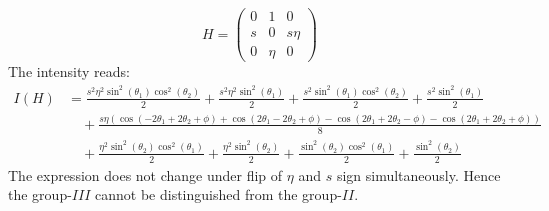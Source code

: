 \documentclass[prd,preprintnumbers,floatfix,
nofootinbib,superscriptaddress]{revtex4}
\newcommand{\II}{\ensuremath{{I\!I}}}
\newcommand{\III}{\ensuremath{{I\!I\!I}}}
\begin{document}
\begin{equation}
  H = \begin{pmatrix}
    0 &1 &0 \\
    s & 0 &s\eta \\
    0 &\eta &0
  \end{pmatrix}
\end{equation}
The intensity reads:
\begin{align}
  I(H) &= \frac{s^{2} \eta^{2} \sin^{2}{\left (\theta_{1} \right )} \cos^{2}{\left (\theta_{2} \right )}}{2} + \frac{s^{2} \eta^{2} \sin^{2}{\left (\theta_{1} \right )}}{2} + \frac{s^{2} \sin^{2}{\left (\theta_{1} \right )} \cos^{2}{\left (\theta_{2} \right )}}{2} + \frac{s^{2} \sin^{2}{\left (\theta_{1} \right )}}{2} \\ \nonumber
   &\quad + \frac{s \eta \left(\cos{\left (- 2 \theta_{1} + 2 \theta_{2} + \phi \right )} + \cos{\left (2 \theta_{1} - 2 \theta_{2} + \phi \right )} - \cos{\left (2 \theta_{1} + 2 \theta_{2} - \phi \right )} - \cos{\left (2 \theta_{1} + 2 \theta_{2} + \phi \right )}\right)}{8}\\ \nonumber
   &\quad+\frac{\eta^{2} \sin^{2}{\left (\theta_{2} \right )} \cos^{2}{\left (\theta_{1} \right )}}{2} + \frac{\eta^{2} \sin^{2}{\left (\theta_{2} \right )}}{2} + \frac{\sin^{2}{\left (\theta_{2} \right )} \cos^{2}{\left (\theta_{1} \right )}}{2} + \frac{\sin^{2}{\left (\theta_{2} \right )}}{2}
\end{align}
The expression does not change under flip of $\eta$ and $s$ sign simultaneously.
Hence the group-$\III$ cannot be distinguished from the group-$\II$.


\end{document}

